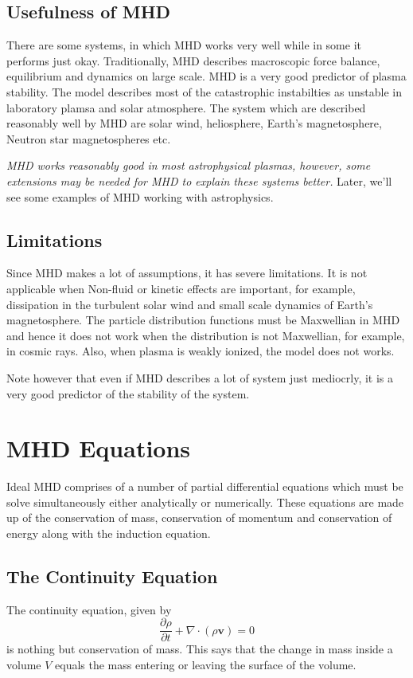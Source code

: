 \documentclass[12pt]{article}
\newenvironment{changemargin}[2]{
\begin{list}{}{
\setlength{\topsep}{0pt}
\setlength{\leftmargin}{#1}
\setlength{\rightmargin}{#2}
\setlength{\listparindent}{\parindent}
\setlength{\itemindent}{\parindent}
\setlength{\parsep}{\parskip}
}
\item[]}{\end{list}}
\begin{document}
\begin{changemargin}{-2cm}{-2cm}
    \subsection{Usefulness of MHD}
    There are some systems, in which MHD works very well while in some it performs just okay. Traditionally, MHD describes macroscopic force balance, equilibrium and dynamics on large scale. MHD is a very good predictor of plasma stability. The model describes most of the catastrophic instabilties as unstable in laboratory plamsa and solar atmosphere. The system which are described reasonably well by MHD are solar wind, heliosphere, Earth's magnetosphere, Neutron star magnetospheres etc.

    \textit{MHD works reasonably good in most
        astrophysical plasmas, however, some extensions may be needed for MHD to explain these systems better.}
    Later, we'll see some examples of MHD working with astrophysics.

    \subsection{Limitations}
    Since MHD makes a lot of assumptions, it has severe limitations. It is not applicable when Non-fluid or kinetic effects are important, for example, dissipation in the turbulent solar wind and small scale dynamics of Earth's magnetosphere. The particle distribution functions must be Maxwellian in MHD and hence it does not work when the distribution is not Maxwellian, for example, in cosmic rays. Also, when plasma is weakly ionized, the model does not works.

    Note however that even if MHD describes a lot of system just mediocrly, it is a very good predictor of the stability of the system.

    \section{MHD Equations}
    Ideal MHD comprises of a number of partial differential equations which must be solve simultaneously either analytically or numerically. These equations are made up of the conservation of mass, conservation of momentum and conservation of energy along with the induction equation.\cite{article2}

    \subsection{The Continuity Equation}
    The continuity equation, given by
    \begin{equation}\label{eq:continuity}
        \frac{\partial \rho}{\partial t}  +\nabla \cdot (\rho \mathbf{v}) = 0
    \end{equation}
    is nothing but conservation of mass. This says that the change in mass inside a volume $V$ equals the mass entering or leaving the surface of the volume.


\end{changemargin}
\end{document}
